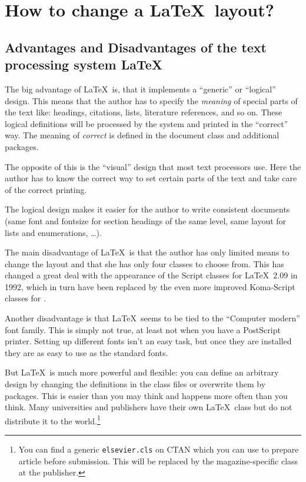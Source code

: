 \documentclass[twoside,a4paper]{refart}
\begin{document}


\section{How to change a \LaTeX\ layout?}
\label{layout}

\subsection{Advantages and Disadvantages of the text processing system \LaTeX}

 The big advantage of \LaTeX\ is, that it 
implements a ``generic'' or ``logical'' design. This means that the author has to 
specify the \emph{meaning} of special parts of the text like: 
headings, citations, lists, literature references, and so on. These 
logical definitions will be processed by the system and printed in 
the ``correct'' way. The meaning of \emph{correct} is defined in the 
document class and additional packages.

The opposite of this is the ``visual'' design 
that most text processors use. Here the author has to know the correct 
way to set certain parts of the text and take care of the correct 
printing.

The logical design makes it easier for the author to write 
consistent documents (same font and fontsize for section headings 
of the same level, same layout for lists and enumerations, \dots).

The main disadvantage of \LaTeX\ is that the author has only limited 
means to change the layout and that she has only four classes to 
choose from. This has changed a great deal with the appearance of the 
Script classes for \LaTeX\ 2.09 in 1992, which in turn have been replaced by 
the even more improved Koma-Script classes for \LaTeXe.

Another disadvantage is that \LaTeX\ seems to be tied to the 
``Computer modern'' font family. This is simply not true, at least 
not when you have a PostScript printer. Setting up different fonts 
isn't an easy task, but once they are installed they are as easy 
to use as the standard fonts.

But \LaTeX\ is much more powerful and flexible: you can define an 
arbitrary design by changing the definitions in the class files or 
overwrite them by packages. This is easier than you may think and 
happens more often than you think. Many universities and publishers 
have their own \LaTeX\ class but do not distribute it to the 
world.\footnote{You can find a generic \texttt{elsevier.cls} on CTAN 
which you can use to prepare article before submission. This will be 
replaced by the magazine-specific class at the publisher.}
\end{document}
